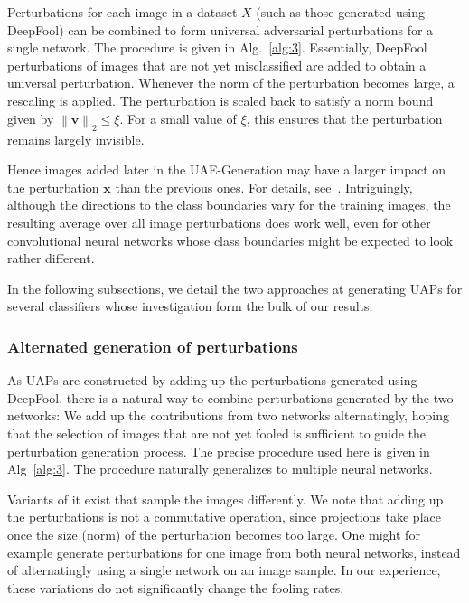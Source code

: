 \documentclass[runningheads]{llncs}
\newcommand{\xb}{\ensuremath{\mathbf{x}}}
\begin{document}
Perturbations for each image in a dataset $X$ (such as those generated using DeepFool) can be combined to form universal adversarial perturbations for a single network. The procedure is given in Alg.~\ref{alg:3}. Essentially, DeepFool perturbations of images that are not yet misclassified are added to obtain a universal perturbation. Whenever the norm of the perturbation becomes large, a rescaling is applied. The perturbation is scaled back to satisfy a norm bound given by \(\left\|\mathbf{v}\right\|_2\leq\xi\). For a small value of \(\xi\), this ensures that the perturbation remains largely invisible.

Hence images added later in the UAE-Generation may have a larger impact on the perturbation $\xb$ than the previous ones. For details, see~\cite{moosavi-dezfooli_universal_2017}. 
Intriguingly, although the directions to the class boundaries vary for the training images, the resulting average over all image perturbations does work well, even for other convolutional neural networks whose class boundaries might be expected to look rather different. 

In the following subsections, we detail the two approaches at generating UAPs for several classifiers whose investigation form the bulk of our results.

\subsubsection{Alternated generation of perturbations}
As UAPs are constructed by adding up the perturbations generated using DeepFool, there is a natural way to combine perturbations generated by the two networks: We add up the contributions from two networks alternatingly, hoping that the selection of images that are not yet fooled is sufficient to guide the perturbation generation process. The precise procedure used here is given in Alg~\ref{alg:3}. The procedure naturally generalizes to multiple neural networks. 

Variants of it exist that sample the images differently. We note that adding up the perturbations is not a commutative operation, since projections take place once the size (norm) of the perturbation becomes too large. One might for example generate perturbations for one image from both neural networks, instead of alternatingly using a single network on an image sample. In our experience, these variations do not significantly change the fooling rates.
 
\end{document}
